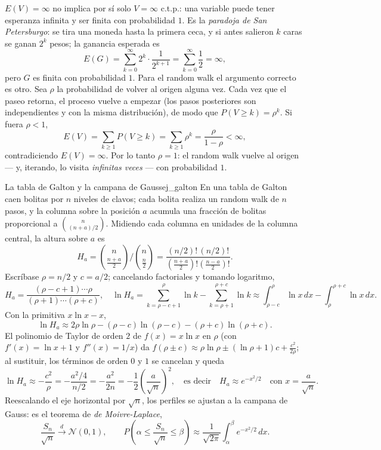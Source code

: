 \documentclass[11pt, a4paper]{article}
\begin{document}
\obs $E(V) = \infty$ no implica por sí solo $V = \infty$ c.t.p.: una variable puede tener
esperanza infinita y ser finita con probabilidad $1$. Es la \emph{paradoja de San
Petersburgo}: se tira una moneda hasta la primera ceca, y si antes salieron $k$ caras se ganan
$2^k$ pesos; la ganancia esperada es
$$ E(G) = \sum_{k=0}^\infty 2^k \cdot \frac{1}{2^{k+1}} = \sum_{k=0}^\infty \frac{1}{2} =
\infty, $$
pero $G$ es finita con probabilidad $1$. Para el random walk el argumento correcto es otro. Sea
$\rho$ la probabilidad de volver al origen alguna vez. Cada vez que el paseo retorna, el
proceso vuelve a empezar (los pasos posteriores son independientes y con la misma
distribución), de modo que $P(V \ge k) = \rho^k$. Si fuera $\rho < 1$,
$$ E(V) = \sum_{k \ge 1} P(V \ge k) = \sum_{k \ge 1} \rho^k = \frac{\rho}{1 - \rho} < \infty, $$
contradiciendo $E(V) = \infty$. Por lo tanto $\rho = 1$: el random walk vuelve al origen — y,
iterando, lo visita \emph{infinitas veces} — con probabilidad $1$.

\begin{ejemplo}{La tabla de Galton y la campana de Gauss}{ej_galton}
En una tabla de Galton caen bolitas por $n$ niveles de clavos; cada bolita realiza un random
walk de $n$ pasos, y la columna sobre la posición $a$ acumula una fracción de bolitas
proporcional a $\binom{n}{(n+a)/2}$. Midiendo cada columna en unidades de la columna central,
la altura sobre $a$ es
$$ H_a = \binom{n}{\frac{n+a}{2}} \Big/ \binom{n}{\frac{n}{2}} =
\frac{(n/2)! \, (n/2)!}{\left(\frac{n+a}{2}\right)! \left(\frac{n-a}{2}\right)!}. $$
Escríbase $\rho = n/2$ y $c = a/2$; cancelando factoriales y tomando logaritmo,
$$ H_a = \frac{(\rho - c + 1) \cdots \rho}{(\rho + 1) \cdots (\rho + c)}, \quad
\ln H_a = \sum_{k = \rho - c + 1}^{\rho} \ln k - \sum_{k = \rho + 1}^{\rho + c} \ln k
\approx \int_{\rho - c}^{\rho} \ln x \, dx - \int_{\rho}^{\rho + c} \ln x \, dx. $$
Con la primitiva $x \ln x - x$,
$$ \ln H_a \approx 2 \rho \ln \rho - (\rho - c) \ln(\rho - c) - (\rho + c) \ln(\rho + c). $$
El polinomio de Taylor de orden $2$ de $f(x) = x \ln x$ en $\rho$ (con $f'(x) = \ln x + 1$ y
$f''(x) = 1/x$) da $f(\rho \pm c) \approx \rho \ln \rho \pm (\ln \rho + 1) c +
\frac{c^2}{2\rho}$; al sustituir, los términos de orden $0$ y $1$ se cancelan y queda
$$ \ln H_a \approx -\frac{c^2}{\rho} = -\frac{a^2/4}{n/2} = -\frac{a^2}{2n}
= -\frac{1}{2} \left( \frac{a}{\sqrt{n}} \right)^{\!2}, \quad \text{es decir} \quad
H_a \approx e^{-x^2/2} \quad \text{con } x = \frac{a}{\sqrt{n}}. $$
Reescalando el eje horizontal por $\sqrt{n}$, los perfiles se ajustan a la campana de Gauss:
es el teorema de \emph{de Moivre-Laplace},
$$ \frac{S_n}{\sqrt{n}} \xrightarrow{d} \mathcal{N}(0, 1), \qquad
P\!\left( \alpha \le \frac{S_n}{\sqrt{n}} \le \beta \right) \approx \frac{1}{\sqrt{2 \pi}}
\int_\alpha^\beta e^{-x^2/2} \, dx. $$
\end{ejemplo}
\end{document}
